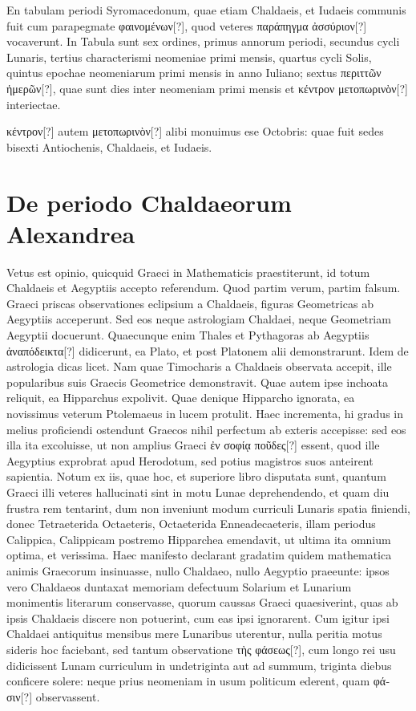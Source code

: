 En tabulam periodi Syromacedonum, quae etiam Chaldaeis, et
Iudaeis communis fuit cum parapegmate \textgreek{φαινομένων[?]}, quod veteres
\textgreek{παράπηγμα ἀσσύριον[?]} vocaverunt.
In Tabula sunt sex ordines, primus
annorum periodi, secundus cycli Lunaris, tertius characterismi neomeniae
primi mensis, quartus cycli Solis, quintus epochae neomeniarum
primi mensis in anno Iuliano; sextus \textgreek{περιττῶν ἡμερῶν[?]}, quae sunt
dies inter neomeniam primi mensis et
 \textgreek{κέντρον μετοπωρινὸν[?]} interiectae.

\textgreek{κέντρον[?]} autem \textgreek{μετοπωρινὸν[?]}
 alibi monuimus ese  Octobris: quae fuit
sedes bisexti Antiochenis, Chaldaeis, et Iudaeis.

\section{De periodo Chaldaeorum Alexandrea}
Vetus est opinio, quicquid Graeci in Mathematicis praestiterunt,
id totum Chaldaeis et Aegyptiis accepto referendum.
Quod partim verum, partim falsum.
Graeci priscas observationes
eclipsium %
 a Chaldaeis, figuras Geometricas ab Aegyptiis acceperunt.
Sed eos neque astrologiam Chaldaei, neque Geometriam Aegyptii docuerunt.
Quaecunque enim Thales et Pythagoras ab Aegyptiis
 \textgreek{ἀναπόδεικτα[?]}
didicerunt, ea Plato, et post Platonem alii demonstrarunt.
Idem de astrologia dicas licet.
Nam quae Timocharis a Chaldaeis observata
accepit, ille popularibus suis Graecis Geometrice demonstravit.
Quae autem ipse inchoata reliquit, ea Hipparchus expolivit.
Quae
denique Hipparcho ignorata, ea novissimus veterum Ptolemaeus
in lucem protulit.
Haec incrementa, hi gradus in melius proficiendi
ostendunt Graecos nihil perfectum ab exteris accepisse: sed eos
illa ita excoluisse, ut non amplius Graeci
 \textgreek{ἐν σοφίᾳ ποῦδες[?]} essent, quod
ille Aegyptius exprobrat apud Herodotum, sed potius magistros suos
anteirent sapientia.
Notum ex iis, quae hoc, et superiore libro disputata
sunt, quantum Graeci illi veteres hallucinati sint in motu Lunae
deprehendendo, et quam diu frustra rem tentarint, dum non inveniunt
modum curriculi Lunaris spatia finiendi, donec Tetraeterida
Octaeteris, Octaeterida Enneadecaeteris, illam periodus Calippica,
Calippicam postremo Hipparchea emendavit, ut ultima ita omnium
optima, et verissima.
Haec manifesto declarant gradatim
quidem mathematica animis Graecorum insinuasse, nullo Chaldaeo,
nullo Aegyptio praeeunte: ipsos vero Chaldaeos duntaxat memoriam
defectuum Solarium et Lunarium monimentis literarum
conservasse, quorum caussas Graeci quaesiverint, quas ab ipsis
Chaldaeis discere non potuerint, cum eas ipsi ignorarent.
Cum igitur
ipsi Chaldaei antiquitus mensibus mere Lunaribus uterentur,
nulla peritia motus sideris hoc faciebant, sed tantum observatione
\textgreek{τὴς φάσεως[?]},
 cum longo rei usu didicissent Lunam curriculum in undetriginta
aut ad summum, triginta diebus conficere solere: neque prius neomeniam
in usum politicum ederent, quam \textgreek{φάσιν[?]} observassent.

